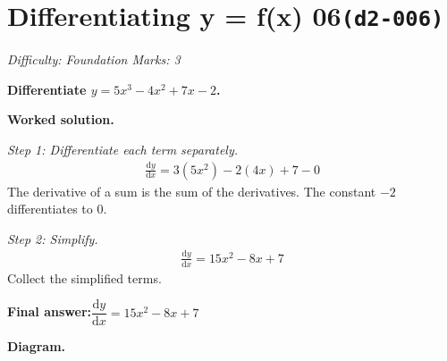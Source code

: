 \documentclass[11pt]{article}
\newcommand{\question}[1]{\par\medskip\noindent\textbf{#1}\par}
\begin{document}
\section*{Differentiating y = f(x) 06\quad\small\texttt{(d2-006)}}
\textit{Difficulty: Foundation \quad\textbar\quad Marks: 3}

\question{Differentiate \( y = 5x^3 - 4x^2 + 7x - 2 \).}

\textbf{Worked solution.}

\textit{Step 1: Differentiate each term separately.}
\[\begin{gathered}
\frac{\mathrm{d}y}{\mathrm{d}x} = 3(5x^2) - 2(4x) + 7 - 0
\end{gathered}\]
The derivative of a sum is the sum of the derivatives. The constant \(-2\) differentiates to 0.

\textit{Step 2: Simplify.}
\[\begin{gathered}
\frac{\mathrm{d}y}{\mathrm{d}x} = 15x^2 - 8x + 7
\end{gathered}\]
Collect the simplified terms.

\begin{answerbox}
\textbf{Final answer:}\quad \(\displaystyle  \dfrac{\mathrm{d}y}{\mathrm{d}x} = 15x^2 - 8x + 7 \)
\end{answerbox}
\textbf{Diagram.}
\end{document}
